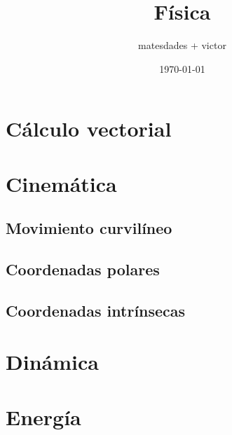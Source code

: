 \documentclass{article}
\title{Física}
\author{matesdades + victor}
\date{\today}
\begin{document}
\maketitle

\section{Cálculo vectorial}

\section{Cinemática}

\subsection{Movimiento curvilíneo}
\subsection{Coordenadas polares}
\subsection{Coordenadas intrínsecas}

\section{Dinámica}

\section{Energía}
\end{document}
